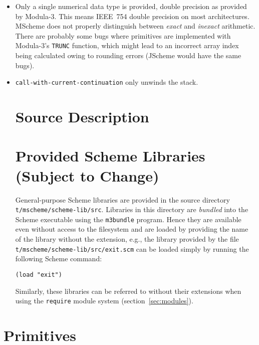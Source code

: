 \begin{itemize}

\item Only a single numerical data type is provided, double precision
  as provided by Modula-3.  This means IEEE~754 double precision on
  most architectures.  MScheme does not properly distinguish between
  {\em exact\/} and {\em inexact\/} arithmetic.  There are probably some
  bugs where primitives are implemented with Modula-3's {\tt TRUNC} function,
  which might lead to an incorrect array index being calculated owing to
  rounding errors 
  (JScheme would have the same bugs).

\item {\tt call-with-current-continuation} only unwinds the stack.

\section{Source Description}

\section{Provided Scheme Libraries (Subject to Change)}\label{sec:provided}

General-purpose Scheme libraries are provided in the source directory
{\tt t/mscheme/scheme-lib/src}.  Libraries in this directory are {\em
  bundled\/} into the Scheme executable using the {\tt m3bundle}
program.  Hence they are available even without access to the
filesystem and are loaded by providing the name of the library without
the extension, e.g., the library provided by the file {\tt
  t/mscheme/scheme-lib/src/exit.scm} can be loaded simply by running
the following Scheme command:
\begin{verbatim}
(load "exit")
\end{verbatim}
Similarly, these libraries can be referred to without their extensions
when using the {\tt require} module system (section~\ref{sec:modules}).

\end{itemize}

\section{Primitives}



